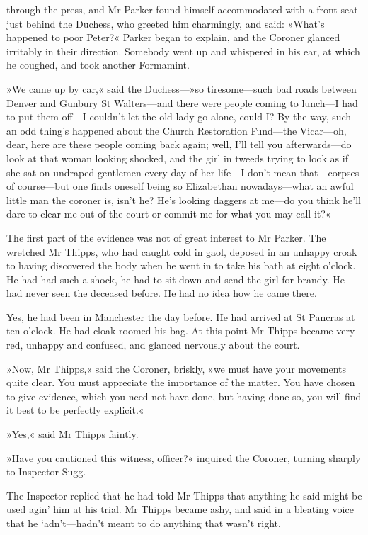 through the press, and Mr Parker found himself accommodated with a front seat just behind the Duchess, who greeted him charmingly, and said: »What's happened to poor Peter?« Parker began to explain, and the Coroner glanced irritably in their direction. Somebody went up and whispered in his ear, at which he coughed, and took another Formamint.

»We came up by car,« said the Duchess---»so tiresome—such bad roads between Denver and Gunbury St Walters—and there were people coming to lunch—I had to put them off—I couldn't let the old lady go alone, could I? By the way, such an odd thing's happened about the Church Restoration Fund—the Vicar—oh, dear, here are these people coming back again; well, I'll tell you afterwards—do look at that woman looking shocked, and the girl in tweeds trying to look as if she sat on undraped gentlemen every day of her life—I don't mean that—corpses of course—but one finds oneself being so Elizabethan nowadays—what an awful little man the coroner is, isn't he? He's looking daggers at me—do you think he'll dare to clear me out of the court or commit me for what-you-may-call-it?«

The first part of the evidence was not of great interest to Mr Parker. The wretched Mr Thipps, who had caught cold in gaol, deposed in an unhappy croak to having discovered the body when he went in to take his bath at eight o'clock. He had had such a shock, he had to sit down and send the girl for brandy. He had never seen the deceased before. He had no idea how he came there.

Yes, he had been in Manchester the day before. He had arrived at St Pancras at ten o'clock. He had cloak-roomed his bag. At this point Mr Thipps became very red, unhappy and confused, and glanced nervously about the court.

»Now, Mr Thipps,« said the Coroner, briskly, »we must have your movements quite clear. You must appreciate the importance of the matter. You have chosen to give evidence, which you need not have done, but having done so, you will find it best to be perfectly explicit.«

»Yes,« said Mr Thipps faintly.

»Have you cautioned this witness, officer?« inquired the Coroner, turning sharply to Inspector Sugg.

The Inspector replied that he had told Mr Thipps that anything he said might be used agin' him at his trial. Mr Thipps became ashy, and said in a bleating voice that he `adn't—hadn't meant to do anything that wasn't right.

